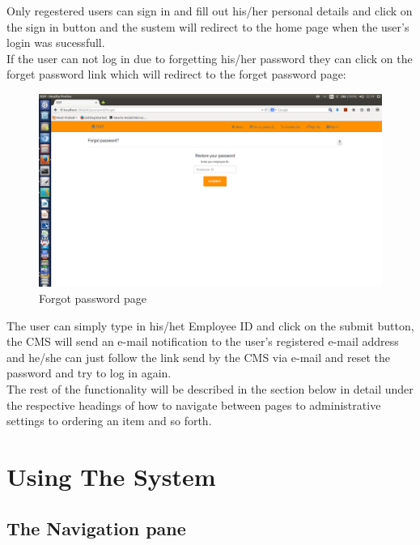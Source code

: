 \documentclass[a4paper,12pt]{article}
\begin{document}
Only regestered users can sign in and fill out his/her personal details and click on the sign in button and the sustem will redirect to the home page when the user's login was sucessfull.\\
If the user can not log in due to forgetting his/her password they can click on the forget password link which will redirect to the forget password page:

\begin{figure}[H]
  \centering
    \includegraphics[width=1.0\textwidth]{screenshots/ForgotPass.png}
    \caption{Forgot password page} 
\end{figure}

The user can simply type in his/het Employee ID and click on the submit button, the CMS will send an e-mail notification to the user's registered e-mail address and he/she can just follow the link send by the CMS via e-mail and reset the password and try to log in again. \\

The rest of the functionality will be described in the section below in detail  under the respective headings of how to navigate between pages to administrative settings to ordering an item and so forth. 


\section{Using The System} 

\subsection{The Navigation pane} 
\end{document}
